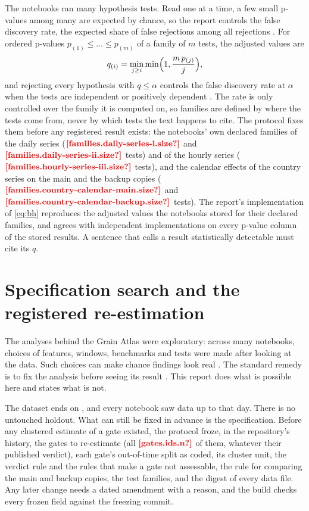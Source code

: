 The notebooks ran many hypothesis tests. Read one at a time, a few small p-values among many are expected by chance,
so the report controls the false discovery rate, the expected share of false rejections among all rejections
\autocite{benjamini1995}. For ordered p-values $p_{(1)} \le \dots \le p_{(m)}$ of a family of $m$ tests, the
adjusted values are
\begin{equation}\label{eq:bh}
  q_{(i)} = \min_{j \ge i} \min\Bigl(1, \frac{m\,p_{(j)}}{j}\Bigr),
\end{equation}
and rejecting every hypothesis with $q \le \alpha$ controls the false discovery rate at $\alpha$ when the tests are
independent or positively dependent \autocite{benjamini2001}. The rate is only controlled over the family it is
computed on, so families are defined by where the tests come from, never by which tests the text happens to cite. The
protocol fixes them before any registered result exists: the notebooks' own declared families of the daily series
($\proto{families.daily-series-i.size}$ and $\proto{families.daily-series-ii.size}$ tests) and of the hourly series
($\proto{families.hourly-series-iii.size}$ tests), and the calendar effects of the country series on the main and the
backup copies ($\proto{families.country-calendar-main.size}$ and $\proto{families.country-calendar-backup.size}$
tests). The report's implementation of \cref{eq:bh} reproduces the adjusted values the notebooks stored for their
declared families, and agrees with independent implementations on every p-value column of the stored results.
A sentence that calls a result statistically detectable must cite its $q$.

\section{Specification search and the registered re-estimation}\label{sec:em-registered}

The analyses behind the Grain Atlas were exploratory: across many notebooks, choices of features, windows, benchmarks
and tests were made after looking at the data. Such choices can make chance findings look real
\autocite{simmons2011}. The standard remedy is to fix the analysis before seeing its result
\autocite{nosek2018}. This report does what is possible here and states what is not.

The dataset ends on , and every notebook saw data up to that day. There is no untouched
holdout. What can still be fixed in advance is the specification. Before any clustered estimate of a gate existed,
the protocol froze, in the repository's history, the gates to re-estimate (all $\proto{gates.ids.n}$ of them,
whatever their published verdict), each gate's out-of-time split as coded, its cluster unit, the verdict rule and the
rules that make a gate not assessable, the rule for comparing the main and backup copies, the test families, and the
digest of every data file. Any later change needs a dated amendment with a reason, and the build checks every frozen
field against the freezing commit.

